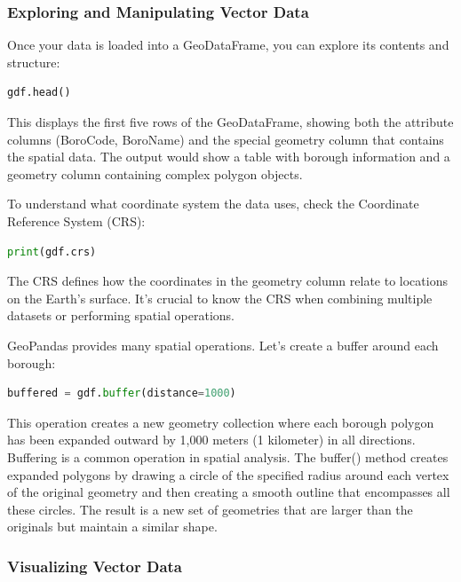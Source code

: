 \subsubsection{Exploring and Manipulating Vector Data}

Once your data is loaded into a GeoDataFrame, you can explore its contents and structure:

\begin{lstlisting}[language=Python]
gdf.head()
\end{lstlisting}

This displays the first five rows of the GeoDataFrame, showing both the attribute columns (BoroCode, BoroName) and the special geometry column that contains the spatial data. The output would show a table with borough information and a geometry column containing complex polygon objects.

To understand what coordinate system the data uses, check the Coordinate Reference System (CRS):

\begin{lstlisting}[language=Python]
print(gdf.crs)
\end{lstlisting}

The CRS defines how the coordinates in the geometry column relate to locations on the Earth's surface. It's crucial to know the CRS when combining multiple datasets or performing spatial operations.

GeoPandas provides many spatial operations. Let's create a buffer around each borough:

\begin{lstlisting}[language=Python]
buffered = gdf.buffer(distance=1000)
\end{lstlisting}

This operation creates a new geometry collection where each borough polygon has been expanded outward by 1,000 meters (1 kilometer) in all directions. Buffering is a common operation in spatial analysis. The buffer() method creates expanded polygons by drawing a circle of the specified radius around each vertex of the original geometry and then creating a smooth outline that encompasses all these circles. The result is a new set of geometries that are larger than the originals but maintain a similar shape.

\subsubsection{Visualizing Vector Data}

